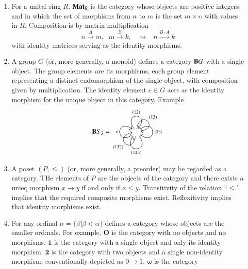 \documentclass[12pt, a4paper, oneside, openright, titlepage]{book}
\begin{document}
\begin{eg}
    \leavevmode
    \begin{enumerate}
        \item For a unital ring $R$, $\normalfont\textbf{Mat}_R$ is the category whose objects are positive integers and in which the set of morphisms from $n$ to $m$ is the set $m\times n$ with values in $R$. Composition is by matrix multiplication \begin{equation*}
                n\xrightarrow{A}m,\;\;m\xrightarrow{B}k,\;\;\;\rightsquigarrow\;\;\;n\xrightarrow{B\cdot A}k
        \end{equation*}
            with identity matrices serving as the identity morphisms.
        \item A group $G$ (or, more generally, a monoid) defines a category $\normalfont\textbf{B}G$ with a single object. The group elements are its morphisms, each group element representing a distinct endomorphism of the single object, with composition given by multiplication. The identity element $e \in G$ acts as the identity morphism for the unique object in this category. Example \begin{equation*}
                \catname{B}S_3 = \begin{tikzcd} 
                    \text{\textperiodcentered} \ar[out = 215, in = 145, loop, distance=3em, "e"] \ar[out =125, in = 55, loop,distance=3em, "(12)"] \ar[out = 35, in = -35,  loop,distance=3em,"(23)"] \ar[out = 305, in = 235, loop, distance=3em,"(123)"] \ar[out = 80, in = 10, loop,distance=3em, "(13)"] \ar[out = 260, in = 190, loop,distance=3em, "(132)"] 
                \end{tikzcd}
            \end{equation*}
        \item A poset $(P,\leq)$ (or, more generally, a preorder) may be regarded as a category. THe elements of $P$ are the objects of the category and there exists a unieq morphism $x\rightarrow y$ if and only if $x \leq y$. Transitivity of the relation ``$\leq$" implies that the required composite morphisms exist. Reflexitivity implies that identity morphisms exist.
        \item For any ordinal $\alpha = \{\beta\vert\beta <\alpha\}$ defines a category whose objects are the smaller ordinals. For example, $\mathbf{O}$ is the category with no objects and no morphisms. $\mathbf{1}$ is the category with a single object and only its identity morphism. $\mathbf{2}$ is the category with two objects and a single non-identity morphism, conventionally depicted as $0\rightarrow 1$, $\mathbf{\omega}$ is the category  \begin{equation*}

\end{equation*}
\end{enumerate}
\end{eg}
\end{document}
